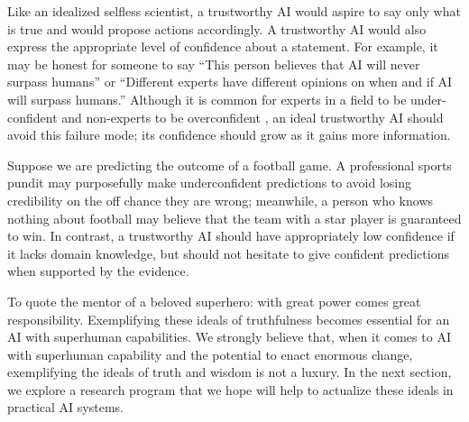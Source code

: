 Like an idealized selfless scientist, a trustworthy AI would aspire to say only what is true and would propose actions accordingly. A trustworthy AI would also express the appropriate level of confidence about a statement. 
For example, it may be honest for someone to say 
``This person believes that AI will never surpass humans'' or ``Different experts have different opinions on when and if AI will surpass humans.'' 
Although it is common for experts in a field to be under-confident and non-experts to be overconfident \cite{kruger1999unskilled}, an ideal trustworthy AI should avoid this failure mode; its confidence should grow as it gains more information. 

Suppose we are predicting the outcome of a football game. A professional sports pundit may purposefully make underconfident predictions to avoid losing credibility on the off chance they are wrong; meanwhile, a person who knows nothing about football may believe that the team with a star player is guaranteed to win. In contrast, a trustworthy AI should have appropriately low confidence if it lacks domain knowledge, but should not hesitate to give confident predictions when supported by the evidence.

To quote the mentor of a beloved superhero: with great power comes great responsibility.
Exemplifying these ideals of truthfulness becomes essential for an AI with superhuman capabilities.
We strongly believe that, when it comes to AI with superhuman capability and the potential to enact enormous change, exemplifying the ideals of truth and wisdom is not a luxury. 
In the next section, we explore a research program that we hope will help to actualize these ideals in practical AI systems. 